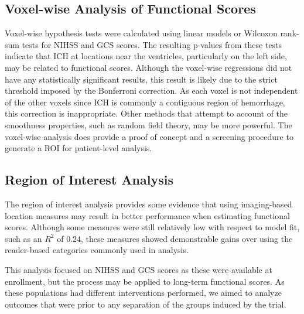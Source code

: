 \documentclass[10pt]{article}\usepackage[]{graphicx}\usepackage[]{color}
\begin{document}
 



\subsection*{Voxel-wise Analysis of Functional Scores}

Voxel-wise hypothesis tests were calculated using linear models or Wilcoxon rank-sum tests for NIHSS and GCS scores.  The resulting p-values from these tests indicate that ICH at locations near the ventricles, particularly on the left side, may be related to functional scores.  Although the voxel-wise regressions did not have any statistically significant results, this result is likely due to the strict threshold imposed by the Bonferroni correction.  As each voxel is not independent of the other voxels since ICH is commonly a contiguous region of hemorrhage, this correction is inappropriate.  Other methods that attempt to account of the smoothness properties, such as random field theory, may be more powerful.  The voxel-wise analysis does provide a proof of concept and a screening procedure to generate a ROI for patient-level analysis.

\subsection*{Region of Interest Analysis}

The region of interest analysis provides some evidence that using imaging-based location measures may result in better performance when estimating functional scores.  Although some measures were still relatively low with respect to model fit, such as an $R^2$ of $0.24$, these measures showed demonstrable gains over using the reader-based categories commonly used in analysis.

This analysis focused on NIHSS and GCS scores as these were available at enrollment, but the process may be applied to long-term functional scores.  As these populations had different interventions performed, we aimed to analyze outcomes that were prior to any separation of the groups induced by the trial.  
\end{document}
